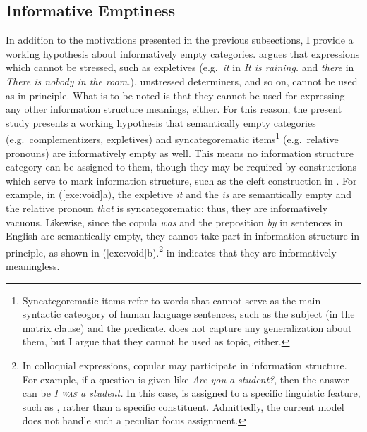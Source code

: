 \subsection{Informative Emptiness}  
\label{9:sec:hypotheses}


In addition to the motivations presented in the previous subsections,
I provide a working hypothesis about informatively empty categories.
\citet[p.\ 156]{lambrecht:96} argues that expressions which cannot be
stressed, such as expletives (e.g.\ \textit{it} in \textit{It is
  raining.} and \textit{there} in \textit{There is nobody in the
  room.}), unstressed determiners, and so on, cannot be used as 
in principle.  What is to be noted is that they cannot be used for
expressing any other information structure meanings, either.  For this
reason, the present study presents a working hypothesis that
semantically empty categories (e.g.\ complementizers, expletives) and
syncategorematic items\footnote{Syncategorematic items refer to words
  that cannot serve as the main syntactic cateogory of human language
  sentences, such as the subject (in the matrix clause) and the
  predicate.  \citet{lambrecht:96} does not capture any generalization
  about them, but I argue that they cannot be used as topic, either.}
(e.g.\ relative pronouns) are informatively empty as well. This means
no information structure category can be assigned to them, though they
may be required by constructions which serve to mark information
structure, such as the cleft construction in
. For example, in
(\ref{exe:void}a), the expletive {\it it} and the  {\it
  is} are semantically empty and the relative pronoun {\it that} is
syncategorematic; thus, they are informatively vacuous. Likewise,
since the copula {\it was} and the preposition {\it by} in
 sentences in English are semantically empty, they cannot
take part in information structure in principle, as shown in
(\ref{exe:void}b).\footnote{In colloquial expressions, copular may
  participate in information structure.  For example, if a question is
  given like \textit{Are you a student?}, then the answer can be
  \textit{I \textsc{was} a student.}  In this case,  is assigned
  to a specific linguistic feature, such as , rather than a
  specific constituent.  Admittedly, the current model does not handle
  such a peculiar focus assignment.}   in
 indicates that they are informatively meaningless.






